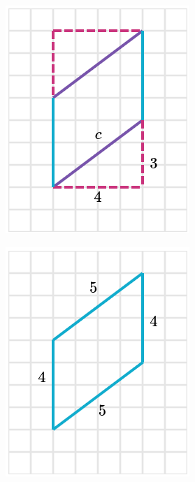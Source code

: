 \begin{solutionbox}{14cm}
\begin{minipage}{0.4\textwidth}
\begin{multicols}{2}
\begin{figure}[H]
                \includegraphics[width=0.9\linewidth]{../images/peri_paralelogramo_01c.png}
                \caption{}
                \label{fig:peri_paralelogramo_01c}
            \end{figure}
            \begin{figure}[H]
                \centering
                \includegraphics[width=0.9\linewidth]{../images/peri_paralelogramo_01d.png}

\end{figure}
\end{multicols}
\end{minipage}
\end{solutionbox}
